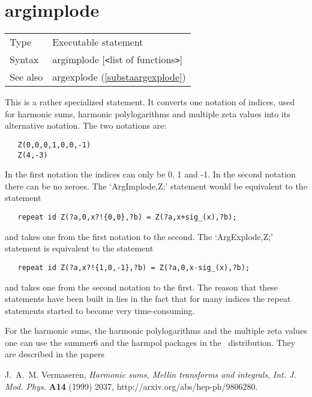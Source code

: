 
\section{argimplode}
\label{substaargimplode}

\noindent \begin{tabular}{ll}
Type & Executable statement\\
Syntax & argimplode [{\tt<}list of functions{\tt>}] \\
See also & argexplode (\ref{substaargexplode})
\end{tabular} \vspace{4mm}

\noindent This is a rather specialized statement. It converts one notation 
of indices, used for harmonic sums, harmonic 
polylogarithms and multiple zeta values into 
its alternative notation. The two notations are:
\begin{verbatim}
   Z(0,0,0,1,0,0,-1)
   Z(4,-3)
\end{verbatim}
In the first notation the indices can only be 0, 1 and -1. In the second 
notation there can be no zeroes. The `ArgImplode,Z;' 
statement would be 
equivalent to the statement
\begin{verbatim}
   repeat id Z(?a,0,x?!{0,0},?b) = Z(?a,x+sig_(x),?b);
\end{verbatim}
and takes one from the first notation to the second. The `ArgExplode,Z;' 
statement is equivalent to the statement
\begin{verbatim}
   repeat id Z(?a,x?!{1,0,-1},?b) = Z(?a,0,x-sig_(x),?b);
\end{verbatim}
and takes one from the second notation to the first. The reason that these 
statements have been built in lies in the fact that for many indices the 
repeat statements started to become very time-consuming.

\noindent For the harmonic sums, the harmonic polylogarithms and the 
multiple zeta values one can use the summer6 and the harmpol packages in 
the \FORM\ distribution. They are described in the papers

J.~A.~M. Vermaseren, {\it Harmonic sums, Mellin transforms and integrals},
  {\em Int. J. Mod. Phys.} {\bf A14} (1999) 2037,
  http://arxiv.org/abs/hep-ph/9806280.

